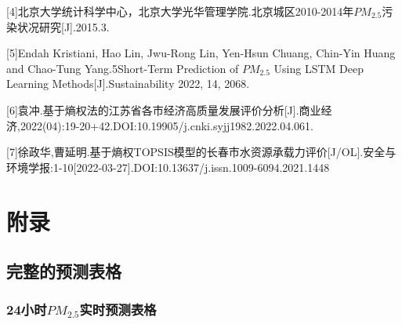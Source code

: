 \documentclass[UTF8]{ctexart}
\begin{document}
[4]北京大学统计科学中心，北京大学光华管理学院.北京城区2010-2014年$PM_{2.5}$污染状况研究[J].2015.3.

[5]Endah Kristiani, Hao Lin, Jwu-Rong Lin, Yen-Hsun Chuang, Chin-Yin Huang and Chao-Tung Yang.5Short-Term Prediction of $PM_{2.5}$ Using LSTM Deep Learning Methods[J].Sustainability 2022, 14, 2068.

[6]袁冲.基于熵权法的江苏省各市经济高质量发展评价分析[J].商业经济,2022(04):19-20+42.DOI:10.19905/j.cnki.syjj1982.2022.04.061.

[7]徐政华,曹延明.基于熵权TOPSIS模型的长春市水资源承载力评价[J/OL].安全与环境学报:1-10[2022-03-27].DOI:10.13637/j.issn.1009-6094.2021.1448


\appendix
\section{附录}
\subsection{完整的预测表格}
\subsubsection{24小时$PM_{2.5}$实时预测表格}
\end{document}
